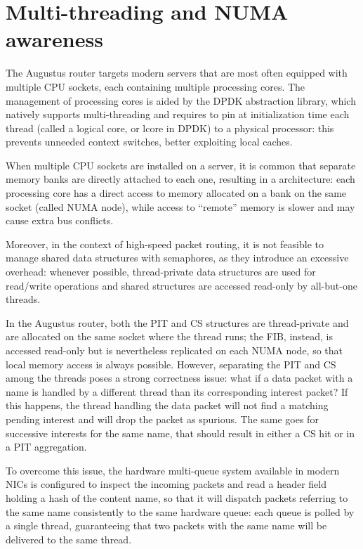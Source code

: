 \documentclass[11pt,a4paper,twoside,titlepage,openany]{book}
\newcommand{\mono}[1]{{\footnotesize \ttfamily #1}}
\begin{document}
\section{Multi-threading and NUMA awareness}\label{sec:augustus.numa}
The Augustus router targets modern servers that are most often equipped with multiple CPU sockets, each containing multiple processing cores. The management of processing cores is aided by the DPDK abstraction library, which natively supports multi-threading and requires to pin at initialization time each thread (called a logical core, or \mono{lcore} in DPDK) to a physical processor: this prevents unneeded context switches, better exploiting local caches.

When multiple CPU sockets are installed on a server, it is common that separate memory banks are directly attached to each one, resulting in a  architecture: each processing core has a direct access to memory allocated on a bank on the same socket (called NUMA node), while access to ``remote'' memory is slower and may cause extra bus conflicts.

Moreover, in the context of high-speed packet routing, it is not feasible to manage shared data structures with semaphores, as they introduce an excessive overhead: whenever possible, thread-private data structures are used for read/write operations and shared structures are accessed read-only by all-but-one threads.

In the Augustus router, both the \gls{PIT} and \gls{CS} structures are thread-private and are allocated on the same socket where the thread runs; the \gls{FIB}, instead, is accessed read-only but is nevertheless replicated on each NUMA node, so that local memory access is always possible.
However, separating the \gls{PIT} and \gls{CS} among the threads poses a strong correctness issue: what if a data packet with a name is handled by a different thread than its corresponding interest packet? If this happens, the thread handling the data packet will not find a matching pending interest and will drop the packet as spurious. The same goes for successive interests for the same name, that should result in either a CS hit or in a PIT aggregation.

To overcome this issue, the hardware multi-queue system available in modern NICs is configured to inspect the incoming packets and read a header field holding a hash of the content name, so that it will dispatch packets referring to the same name consistently to the same hardware queue: each queue is polled by a single thread, guaranteeing that two packets with the same name will be delivered to the same thread.
\end{document}
